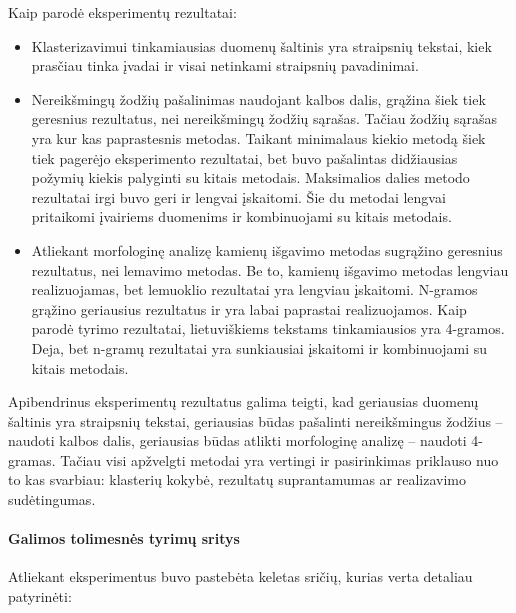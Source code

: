 \documentclass{VUMIFInfBakalaurinis}
\begin{document}
Kaip parodė eksperimentų rezultatai:

\begin{itemize}
\item
  Klasterizavimui tinkamiausias duomenų šaltinis yra straipsnių tekstai,
  kiek prasčiau tinka įvadai ir visai netinkami straipsnių pavadinimai.
\item
  Nereikšmingų žodžių pašalinimas naudojant kalbos dalis, grąžina šiek
  tiek geresnius rezultatus, nei nereikšmingų žodžių sąrašas. Tačiau
  žodžių sąrašas yra kur kas paprastesnis metodas. Taikant minimalaus kiekio
  metodą šiek tiek pagerėjo eksperimento rezultatai, bet buvo pašalintas didžiausias požymių
  kiekis palyginti su kitais metodais. Maksimalios dalies metodo rezultatai
  irgi buvo geri ir lengvai įskaitomi. Šie du metodai lengvai pritaikomi
  įvairiems duomenims ir kombinuojami su kitais metodais.
\item
  Atliekant morfologinę analizę kamienų išgavimo metodas sugrąžino
  geresnius rezultatus, nei lemavimo metodas. Be to, kamienų išgavimo
  metodas lengviau realizuojamas, bet lemuoklio rezultatai yra lengviau
  įskaitomi. N-gramos grąžino geriausius rezultatus ir yra labai
  paprastai realizuojamos. Kaip parodė tyrimo rezultatai, lietuviškiems
  tekstams tinkamiausios yra 4-gramos. Deja, bet n-gramų rezultatai yra
  sunkiausiai įskaitomi ir kombinuojami su kitais metodais.
\end{itemize}

Apibendrinus eksperimentų rezultatus galima teigti, kad geriausias
duomenų šaltinis yra straipsnių tekstai, geriausias būdas pašalinti
nereikšmingus žodžius -- naudoti kalbos dalis, geriausias būdas atlikti
morfologinę analizę -- naudoti 4-gramas. Tačiau visi apžvelgti metodai
yra vertingi ir pasirinkimas priklauso nuo to kas svarbiau: klasterių
kokybė, rezultatų suprantamumas ar realizavimo sudėtingumas.

\paragraph{Galimos tolimesnės tyrimų sritys}

Atliekant eksperimentus buvo pastebėta keletas sričių, kurias verta
detaliau patyrinėti:
\end{document}
